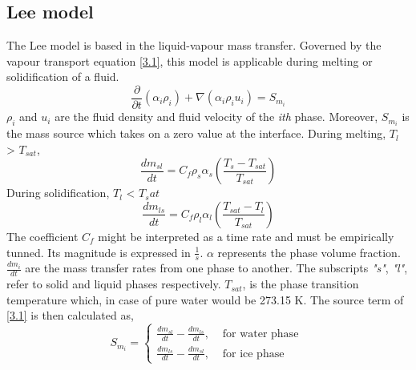 \subsection{Lee model}
The Lee model is based in the liquid-vapour mass transfer. Governed by the vapour transport equation \ref{3.1}, this model is applicable during melting or solidification of a fluid.
\begin{equation}
\label{3.1}
\frac{\partial}{\partial t}\left(\alpha_{i} \rho_{i}\right)+\nabla\left(\alpha_{i} \rho_{i} {u}_{i}\right)=S_{m _i}
\end{equation}
\textit{$\rho_i$} and \textbf{$u_i$} are the fluid density and fluid velocity of the \textit{i{th}} phase. Moreover, $S_{m_i}$ is the mass source which takes on a zero value at the interface.
\newline
During melting, $T_l$ > $T_{sat}$,
\begin{equation}
\label{3.2}
\frac{d m_{s l}}{d t}=C_{f} \rho_{s} \alpha_{s}\left(\frac{T_{s}-T_{s a t}}{T_{s a t}}\right)
\end{equation}
During solidification, $T_l$ < $T_sat$
\begin{equation}
\label{3.3}
\frac{d m_{l s}}{d t}=C_{f} \rho_{l} \alpha_{l}\left(\frac{T_{s a t}-T_{l}}{T_{s a t}}\right)
\end{equation}
The coefficient $C_f$ might be interpreted as a time rate and must be empirically tunned. Its magnitude is expressed in $\frac{1}{s}$. $\alpha$ represents the phase volume fraction. $\frac{d m_{i}}{d t}$ are the mass transfer rates from one phase to another. The subscripts \textit{"s"}, \textit{"l"}, refer to solid and liquid phases respectively. \textit{$T_{sat}$}, is the phase transition temperature which, in case of pure water would be 273.15 K.
The source term of \ref{3.1} is then calculated as,
\begin{equation}
\label{3.4}
S_{m_{i}}=\left\{\begin{array}{lr}
\frac{d m_{s l}}{d t}-\frac{d m_{l s}}{d t}, & \text { for water phase } \\
\frac{d m_{l s}}{d t}-\frac{d m_{s l}}{d t}, & \text { for ice phase }
\end{array}\right.
\end{equation}  
